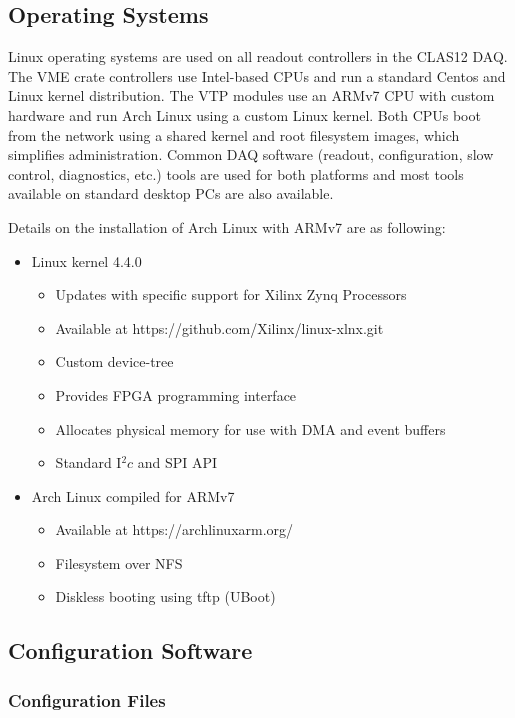 \subsection{Operating Systems}

Linux operating systems are used on all readout controllers in the CLAS12 DAQ. The VME crate controllers use
Intel-based CPUs and run a standard Centos and Linux kernel distribution. The VTP modules use an ARMv7 CPU
with custom hardware and run Arch Linux using a custom Linux kernel. Both CPUs boot from the network using a
shared kernel and root filesystem images, which simplifies administration. Common DAQ software (readout,
configuration, slow control, diagnostics, etc.) tools are used for both platforms and most tools available on
standard desktop PCs are also available.

Details on the installation of Arch Linux with ARMv7 are as following:

\begin{itemize}
\item Linux kernel 4.4.0
  \begin{itemize}
  \item Updates with specific support for Xilinx Zynq Processors
  \item Available at https://github.com/Xilinx/linux-xlnx.git
  \item Custom device-tree
  \item Provides FPGA programming interface
  \item Allocates physical memory for use with DMA and event buffers
  \item Standard I$^2c$ and SPI API
  \end{itemize}

\item Arch Linux compiled for ARMv7
  \begin{itemize}
  \item Available at https://archlinuxarm.org/
  \item Filesystem over NFS
  \item Diskless booting using tftp (UBoot)
  \end{itemize}
\end{itemize}

\subsection{Configuration Software}

\subsubsection{Configuration Files}

